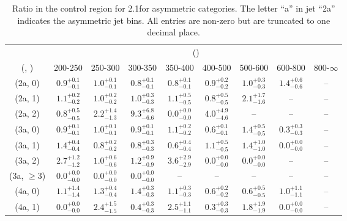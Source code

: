 \begin{table}[h!]
\tiny
\centering
\caption{Ratio in the \mmj control region for 2.1\ifb for asymmetric categories. The letter ``a'' in jet \eg ``2a''  indicates the asymmetric jet bins. All entries are non-zero but are truncated to one decimal place.\label{tab:ratiosepnaive_mumu_ewk_asym}}
\begin{tabular}
{ccccccccc}
	\hline\hline
	& \multicolumn{8}{c}{\scalht (\gev)} \\ 
	 (\njet,  \nb) & 200-250 & 250-300 & 300-350 & 350-400 & 400-500 & 500-600 & 600-800 & 800-$\infty$ \\ [0.8ex] 
\hline
	(2a, 0) & $0.9^{+ 0.1 }_{- 0.1 }$ & $1.0^{+ 0.1 }_{- 0.1 }$ & $0.8^{+ 0.1 }_{- 0.1 }$ & $0.8^{+ 0.1 }_{- 0.1 }$ & $0.9^{+ 0.2 }_{- 0.2 }$ & $1.0^{+ 0.3 }_{- 0.3 }$ & $1.4^{+ 0.6 }_{- 0.6 }$ & -- \\[0.5ex] 
	(2a, 1) & $1.1^{+ 0.2 }_{- 0.2 }$ & $1.0^{+ 0.2 }_{- 0.2 }$ & $1.0^{+ 0.3 }_{- 0.3 }$ & $1.1^{+ 0.5 }_{- 0.5 }$ & $0.8^{+ 0.5 }_{- 0.5 }$ & $2.1^{+ 1.7 }_{- 1.6 }$ & -- & -- \\[0.5ex] 
	(2a, 2) & $0.8^{+ 0.5 }_{- 0.5 }$ & $2.2^{+ 1.4 }_{- 1.3 }$ & $9.3^{+ 6.8 }_{- 6.6 }$ & $0.0^{+ 0.0 }_{- 0.0 }$ & $4.0^{+ 4.9 }_{- 4.6 }$ & -- & -- & -- \\[0.5ex] 
	(3a, 0) & $0.9^{+ 0.1 }_{- 0.1 }$ & $1.0^{+ 0.1 }_{- 0.1 }$ & $0.9^{+ 0.1 }_{- 0.1 }$ & $1.1^{+ 0.2 }_{- 0.2 }$ & $0.6^{+ 0.1 }_{- 0.1 }$ & $1.4^{+ 0.5 }_{- 0.5 }$ & $0.3^{+ 0.3 }_{- 0.3 }$ & -- \\[0.5ex] 
	(3a, 1) & $1.4^{+ 0.4 }_{- 0.4 }$ & $0.8^{+ 0.2 }_{- 0.2 }$ & $0.8^{+ 0.3 }_{- 0.3 }$ & $0.6^{+ 0.4 }_{- 0.4 }$ & $1.1^{+ 0.5 }_{- 0.5 }$ & $1.4^{+ 1.0 }_{- 1.0 }$ & $0.0^{+ 0.0 }_{- 0.0 }$ & -- \\[0.5ex] 
	(3a, 2) & $2.7^{+ 1.2 }_{- 1.2 }$ & $1.0^{+ 0.6 }_{- 0.6 }$ & $1.2^{+ 0.9 }_{- 0.9 }$ & $3.6^{+ 2.9 }_{- 2.9 }$ & $0.0^{+ 0.0 }_{- 0.0 }$ & $0.0^{+ 0.0 }_{- 0.0 }$ & -- & -- \\[0.5ex] 
	(3a, $\ge3$) & $0.0^{+ 0.0 }_{- 0.0 }$ & $0.0^{+ 0.0 }_{- 0.0 }$ & $0.0^{+ 0.0 }_{- 0.0 }$ & -- & -- & -- & -- & -- \\[0.5ex] 
	(4a, 0) & $1.1^{+ 1.4 }_{- 1.4 }$ & $1.3^{+ 0.4 }_{- 0.4 }$ & $1.4^{+ 0.3 }_{- 0.3 }$ & $1.1^{+ 0.3 }_{- 0.3 }$ & $0.6^{+ 0.2 }_{- 0.2 }$ & $0.6^{+ 0.5 }_{- 0.5 }$ & $1.0^{+ 1.1 }_{- 1.1 }$ & -- \\[0.5ex] 
	(4a, 1) & $0.0^{+ 0.0 }_{- 0.0 }$ & $2.4^{+ 1.5 }_{- 1.5 }$ & $0.4^{+ 0.3 }_{- 0.3 }$ & $2.5^{+ 1.1 }_{- 1.1 }$ & $0.3^{+ 0.3 }_{- 0.3 }$ & $1.8^{+ 1.9 }_{- 1.9 }$ & $0.0^{+ 0.0 }_{- 0.0 }$ & -- \\[0.5ex] 

\end{tabular}
\end{table}
